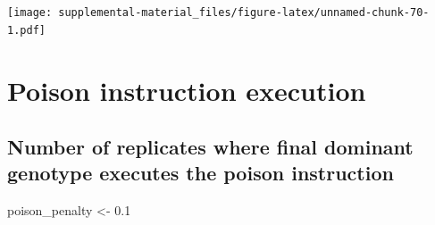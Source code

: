\documentclass[]{book}
\newenvironment{Shaded}{\begin{snugshade}}{\end{snugshade}}
\newcommand{\FloatTok}[1]{\textcolor[rgb]{0.00,0.00,0.81}{#1}}
\newcommand{\NormalTok}[1]{#1}
\newcommand{\StringTok}[1]{\textcolor[rgb]{0.31,0.60,0.02}{#1}}
\begin{document}
\texttt{[image: supplemental-material\_files/figure-latex/unnamed-chunk-70-1.pdf]}

\hypertarget{poison-instruction-execution}{%
\section{Poison instruction execution}\label{poison-instruction-execution}}

\hypertarget{number-of-replicates-where-final-dominant-genotype-executes-the-poison-instruction}{%
\subsection{Number of replicates where final dominant genotype executes the poison instruction}\label{number-of-replicates-where-final-dominant-genotype-executes-the-poison-instruction}}

\begin{Shaded}
\begin{Highlighting}[]
\NormalTok{poison_penalty <-}\StringTok{ }\FloatTok{0.1}
\end{Highlighting}
\end{Shaded}
\end{document}
